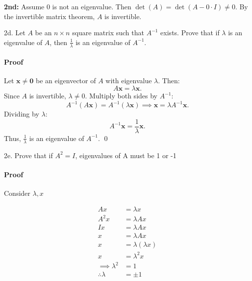 \documentclass[12pt,letterpaper]{article}
\begin{document}
    \textbf{2nd:} Assume \( 0 \) is not an eigenvalue. Then \( \det(A) = \det(A - 0 \cdot I) \neq 0 \).  
    By the invertible matrix theorem, \( A \) is invertible.  
    
    \vspace{0.2cm}  
    \noindent

    \newpage

    2d. Let \( A \) be an \( n \times n \) square matrix such that \( A^{-1} \) exists. Prove that if \( \lambda \) is an eigenvalue of \( A \), then \( \frac{1}{\lambda} \) is an eigenvalue of \( A^{-1} \).

    \paragraph{Proof}
    Let \( \mathbf{x} \neq \mathbf{0} \) be an eigenvector of \( A \) with eigenvalue \( \lambda \). Then:
    \[
    A\mathbf{x} = \lambda\mathbf{x}.
    \]
    Since \( A \) is invertible, \( \lambda \neq 0 \). Multiply both sides by \( A^{-1} \):
    \[
    A^{-1}(A\mathbf{x}) = A^{-1}(\lambda\mathbf{x}) \implies \mathbf{x} = \lambda A^{-1}\mathbf{x}.
    \]
    Dividing by \( \lambda \):
    \[
    A^{-1}\mathbf{x} = \frac{1}{\lambda}\mathbf{x}.
    \]
    Thus, \( \frac{1}{\lambda} \) is an eigenvalue of \( A^{-1} \). \qed

    \vspace{1.2cm}

    2e. Prove that if \(A^2 = I\), eigenvalues of A must be 1 or -1

    \paragraph{Proof}
    Consider \(\lambda, x\)

    \begin{align*}
        Ax &= \lambda x \\
        A^2x &= \lambda Ax  \\
        Ix &= \lambda Ax  \\
        x &= \lambda Ax  \\
        x &= \lambda (\lambda x)  \\
        x &= \lambda^2 x \\
        \implies \lambda^2 &= 1 \\
        \therefore \lambda &= \pm 1
    \end{align*}
\end{document}
